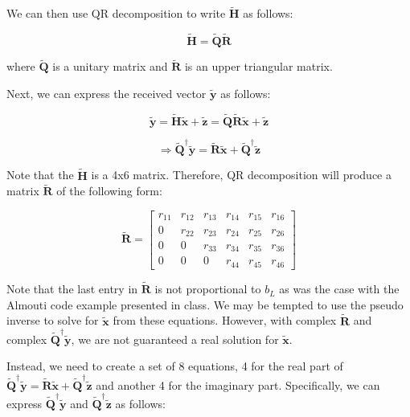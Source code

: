 \documentclass[fleqn]{article}
\begin{document}
\begin{enumerate}
\begin{enumerate}
			We can then use QR decomposition to write $\mathbf{\tilde{H}}$ as follows:
			
			\begin{equation*}
				\mathbf{\tilde{H}} = \mathbf{\tilde{Q}}\mathbf{\tilde{R}}
			\end{equation*}
			
			where $\mathbf{\tilde{Q}}$ is a unitary matrix and $\mathbf{\tilde{R}}$ is an upper triangular matrix.
		
			Next, we can express the received vector $\mathbf{\tilde{y}}$ as follows:
		
			\begin{equation*}
				\mathbf{\tilde{y}} = \mathbf{\tilde{H}\tilde{x}} + \mathbf{\tilde{z}} = \mathbf{\tilde{Q}\tilde{R}\tilde{x}} + \mathbf{\tilde{z}}
			\end{equation*}
		
			\begin{equation*}
				\Rightarrow \mathbf{\tilde{Q}^{\dagger}\tilde{y}} = \mathbf{\tilde{R}\tilde{x}} + \mathbf{\tilde{Q}^{\dagger}\tilde{z}}
			\end{equation*}
		
			Note that the $\mathbf{\tilde{H}}$ is a 4x6 matrix. Therefore, QR decomposition will produce a matrix $\mathbf{\tilde{R}}$ of the following form:
		
			\begin{equation*}
				\mathbf{\tilde{R}} = \begin{bmatrix}
					r_{11} & r_{12} & r_{13} & r_{14} & r_{15} & r_{16}\\
					0      & r_{22} & r_{23} & r_{24} & r_{25} & r_{26}\\
					0      & 0      & r_{33} & r_{34} & r_{35} & r_{36}\\
					0      & 0      & 0      & r_{44} & r_{45} & r_{46}
				\end{bmatrix}
			\end{equation*}
			
			Note that the last entry in $\mathbf{\tilde{R}}$ is not proportional to $b_L$ as was the case with the Almouti code example presented in class. We may be tempted to use the pseudo inverse to solve for $\mathbf{\tilde{x}}$ from these equations. However, with complex $\mathbf{\tilde{R}}$ and complex $\mathbf{\tilde{Q}^{\dagger}\tilde{y}}$, we are not guaranteed a real solution for $\mathbf{\tilde{x}}$.
			
			Instead, we need to create a set of 8 equations, 4 for the real part of $\mathbf{\tilde{Q}^{\dagger}\tilde{y}} = \mathbf{\tilde{R}\tilde{x}} + \mathbf{\tilde{Q}^{\dagger}\tilde{z}}$ and another 4 for the imaginary part. Specifically, we can express $\mathbf{\tilde{Q}}^{\dagger}\mathbf{\tilde{y}}$ and $\mathbf{\tilde{Q}}^{\dagger}\mathbf{\tilde{z}}$ as follows:
		

\end{enumerate}
\end{enumerate}
\end{document}
